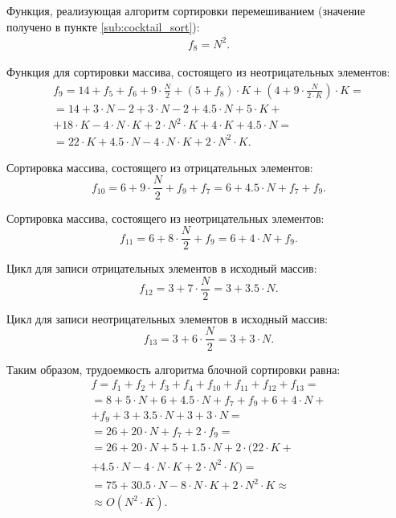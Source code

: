 Функция, реализующая алгоритм сортировки перемешиванием (значение получено в пункте \ref{sub:cocktail_sort}):
\begin{equation}
\begin{gathered}
f_8 = N^2.
\end{gathered}
\end{equation}

Функция для сортировки массива, состоящего из неотрицательных элементов:
\begin{equation}
\begin{gathered}
f_9 = 14 + f_5 + f_6 + 9 \cdot \frac{N}{2} + (5 + f_8) \cdot K + (4 + 9 \cdot \frac{N}{2 \cdot K}) \cdot K = \\ = 14 + 3 \cdot N - 2 + 3 \cdot N - 2 + 4.5 \cdot N + 5 \cdot K + \\ + 18 \cdot K - 4 \cdot N \cdot K + 2 \cdot N^2 \cdot K + 4 \cdot K + 4.5 \cdot N = \\ = 22 \cdot K + 4.5 \cdot N - 4 \cdot N \cdot K + 2 \cdot N^2 \cdot K.
\end{gathered}
\end{equation}

Сортировка массива, состоящего из отрицательных элементов:
\begin{equation}
f_{10} = 6 + 9 \cdot \frac{N}{2} + f_9 + f_7 = 6 + 4.5 \cdot N + f_7 + f_9.
\end{equation}

Сортировка массива, состоящего из неотрицательных элементов:
\begin{equation}
f_{11} = 6 + 8 \cdot \frac{N}{2} + f_9 = 6 + 4 \cdot N + f_9.
\end{equation}

Цикл для записи отрицательных элементов в исходный массив:
\begin{equation}
f_{12} = 3 + 7 \cdot \frac{N}{2} = 3 + 3.5 \cdot N.
\end{equation}

Цикл для записи неотрицательных элементов в исходный массив:
\begin{equation}
f_{13} = 3 + 6 \cdot \frac{N}{2} = 3 + 3 \cdot N.
\end{equation}

Таким образом, трудоемкость алгоритма блочной сортировки равна:
\begin{equation}
\begin{gathered}
f = f_1 + f_2 + f_3 + f_4 + f_{10} + f_{11} + f_{12} + f_{13} = \\ = 8 + 5 \cdot N + 6 + 4.5 \cdot N + f_7 + f_9 + 6 + 4 \cdot N + \\ + f_9 + 3 + 3.5 \cdot N + 3 + 3 \cdot N = \\ = 26 + 20 \cdot N + f_7 + 2 \cdot f_9 = \\ = 26 + 20 \cdot N + 5 + 1.5 \cdot N + 2 \cdot (22 \cdot K + \\ + 4.5 \cdot N - 4 \cdot N \cdot K + 2 \cdot N^2 \cdot K) = \\ = 75 + 30.5 \cdot N - 8 \cdot N \cdot K + 2 \cdot N^2 \cdot K \approx \\ \approx O(N^2 \cdot K).
\end{gathered}
\end{equation}

